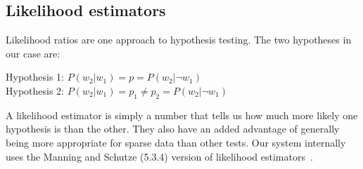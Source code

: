 \subsection{Likelihood estimators} 

Likelihood ratios are one approach to hypothesis testing. The two hypotheses in our case are:

\begin{center}
Hypothesis 1: $P(w_2|w_1) = p = P(w_2|\neg w_1)$ \\
Hypothesis 2: $P(w_2|w_1) = p_1 \neq p_2 = P(w_2|\neg w_1)$	\\	
\end{center}

A likelihood estimator is simply a number that tells us how much more likely one hypothesis is than the other. They also have an added advantage of generally being more appropriate for sparse data than other tests. Our system internally uses the Manning and Schutze (5.3.4) version of likelihood estimators~\cite{manning}.
